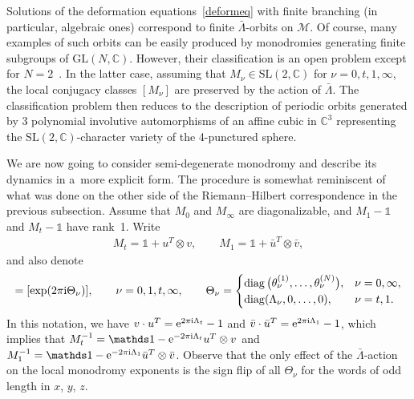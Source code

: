 \documentclass[pdftex]{sigma}
\newcommand\Cb{\mathbb{C}}
\numberwithin{equation}{section}
\begin{document}
Solutions of the deformation equations~\eqref{deformeq} with finite branching (in particular, algebraic ones) correspond to finite $\bar\Lambda$-orbits on $\mathcal M$. Of course, many examples of such orbits can be easily produced by monodromies generating finite subgroups of $\mathrm{GL}(N,\Cb)$. However, their classification is an open problem except for $N=2$~\cite{LT}. In the latter case, assuming that $M_{\nu}\in\mathrm{SL}(2,\Cb)$ for $\nu=0,t,1,\infty$, the local conjugacy classes $ [M_{\nu} ]$ are preserved by the action of $\bar\Lambda$. The classification problem then reduces to the description of periodic orbits generated by 3 polynomial involutive automorphisms of an affine cubic in $\Cb^3$ representing the $\mathrm{SL}(2,\Cb)$-character variety of the 4-punctured sphere.

We are now going to consider semi-degenerate monodromy and describe its dynamics in a~more explicit form. The procedure is somewhat reminiscent of what was done on the other side of the Riemann--Hilbert correspondence in the previous subsection. Assume that $M_0$ and $M_{\infty}$ are diagonalizable, and $M_{1}-\mathds 1$ and $M_{t}-\mathds 1$ have rank~1. Write
\begin{gather}\label{Mt1}
M_t=\mathds 1+u^T\otimes v,\qquad M_1=\mathds 1+\bar u^T\otimes \bar v ,
\end{gather}
and also denote
\begin{gather*}
 [M_{\nu} ]= [\exp(2\pi{\rm i} \Theta_{\nu}) ],\qquad \nu=0,1,t,\infty,\qquad
\Theta_{\nu}=\begin{cases}\operatorname{diag}\big(\theta_{\nu}^{(1)},\ldots, \theta_{\nu}^{(N)}\big), &\nu=0,\infty,\\
\operatorname{diag}(\Lambda_{\nu},0,\ldots,0), & \nu=t,1.
\end{cases}
\end{gather*}
In this notation, we have $v\cdot u^T={\rm e}^{2\pi {\rm i} \Lambda_t}-1$ and $\bar v\cdot \bar u^T={\rm e}^{2\pi{\rm i} \Lambda_1}-1$, which implies that $M_t^{-1}=\mathds 1-{\rm e}^{-2\pi{\rm i}\Lambda_t}u^T\otimes v$ and $M_1^{-1}=\mathds 1-{\rm e}^{-2\pi{\rm i}\Lambda_1}\bar u^T\otimes \bar v$. Observe that the only effect of the $\bar \Lambda$-action on the local monodromy exponents is the sign flip of all $\Theta_{\nu}$ for the words of odd length in $x$, $y$, $z$.
\end{document}
